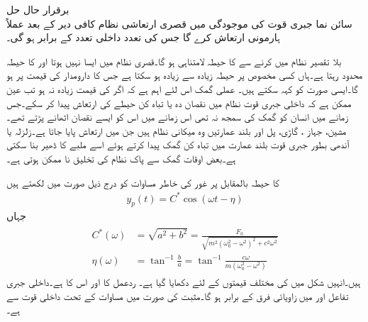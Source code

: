 \quad برقرار حال حل\\
سائن نما جبری قوت کی موجودگی میں قصری ارتعاشی نظام کافی دیر کے بعد عملاً ہارمونی ارتعاش کرے گا جس کی تعدد داخلی تعدد کے برابر ہو گی۔

بلا تقصیر نظام میں   کرنے سے   کا حیطہ لامتناہی ہو گا۔قصری نظام میں ایسا نہیں ہوتا اور  کا حیطہ محدود رہتا ہے۔ہاں کسی مخصوص  پر حیطہ زیادہ سے زیادہ ہو سکتا ہے جس کا دارومدار  کی قیمت پر ہو گا۔ایسی صورت کو  کہہ سکتے ہیں۔ عملی گمک اس لئے اہم ہے کہ اگر  کی قیمت زیادہ نہ ہو تب عین ممکن ہے کہ داخلی  جبری قوت نظام میں نقصان دہ یا  تباہ کن حیطے کی ارتعاش پیدا کر سکے۔جس زمانے میں انسان کو گمک کی سمجھ نہ تھی اس زمانے میں اس کو ایسے نقصان اٹھانے پڑتے تھے۔مشین، جہاز ، گاڑی، پل اور بلند عمارتیں وہ میکانی نظام ہیں جن میں ارتعاش پایا جاتا ہے۔زلزلہ یا آندھی بطور جبری قوت  بلند عمارت میں تباہ کن گمک پیدا کرتے ہوئے اسے ملبے کا ڈھیر بنا سکتی ہے۔بعض اوقات گمک سے پاک نظام کی تخلیق نا ممکن ہوتی ہے۔

 کا حیطہ بالمقابل  پر غور کی خاطر مساوات  کو درج ذیل صورت میں لکھتے ہیں
\begin{align}\label{مساوات_سادہ_دو_برقرار_عملی_گمک_الف}
y_p(t)=C^* \cos(\omega t-\eta)
\end{align}
جہاں
\begin{gather}
\begin{aligned}\label{مساوات_سادہ_دو_حیطہ_زاویہ_الف}
C^*(\omega)&=\sqrt{a^2+b^2}=\frac{F_0}{\sqrt{m^2(\omega_0^2-\omega^2)^2+c^2\omega^2}}\\
\eta(\omega)&=\tan^{-1}\frac{b}{a}=\tan^{-1}\frac{c\omega}{m(\omega_0^2-\omega^2)}
\end{aligned}
\end{gather}
ہیں۔انہیں شکل  میں  کی مختلف قیمتوں کے لئے دکھایا گیا ہے۔ ردعمل  کا  اور  اس کا  ہے۔داخلی جبری تفاعل اور  میں زاویائی فرق  کے برابر ہو گا۔مثبت  کی صورت میں مساوات  کے تحت داخلی قوت سے   ہے۔ 

